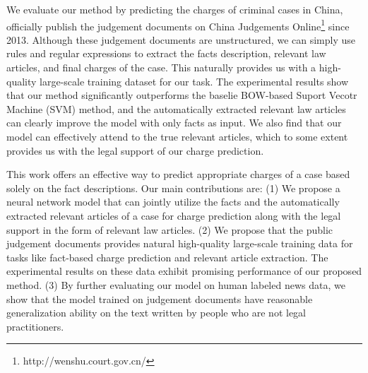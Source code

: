 We evaluate our method by predicting the charges of criminal cases in China,  officially publish the judgement documents on China Judgements Online\footnote{http://wenshu.court.gov.cn/} since 2013. Although these judgement documents are unstructured, we can simply use rules and regular expressions to extract the facts description, relevant law articles, and final charges of the case. This naturally provides us with a high-quality large-scale training dataset for our task. The experimental results show that our method significantly outperforms the baselie BOW-based Suport Vecotr Machine (SVM) method, and the automatically extracted relevant law articles can clearly improve the model with only facts as input. We also find that our model can effectively attend to the true relevant articles, which to some extent provides us with the legal support of our charge prediction.


This work offers an effective way to predict appropriate charges of a case based solely on the fact descriptions. 
Our main contributions are: 
(1) We propose a neural network model that can jointly utilize the facts and the automatically extracted relevant articles of a case for charge prediction along with the legal support in the form of relevant law articles.
(2) We propose that the public judgement documents provides natural high-quality large-scale training data for tasks like fact-based charge prediction and relevant article extraction. The experimental results on these data exhibit promising performance of our proposed method.
(3) By further evaluating our model on human labeled news data, we show that the model trained on judgement documents have reasonable generalization ability on the text written by people who are not legal practitioners. 



